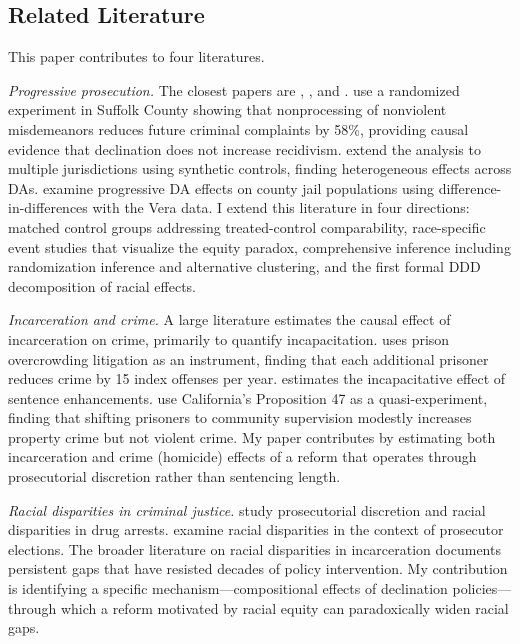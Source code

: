 \documentclass[12pt]{article}
\begin{document}
\subsection{Related Literature}

This paper contributes to four literatures.

\textit{Progressive prosecution.} The closest papers are \citet{agan2023misdemeanor}, \citet{agan2025progressive}, and \citet{petersen2024progressive}. \citet{agan2023misdemeanor} use a randomized experiment in Suffolk County showing that nonprocessing of nonviolent misdemeanors reduces future criminal complaints by 58\%, providing causal evidence that declination does not increase recidivism. \citet{agan2025progressive} extend the analysis to multiple jurisdictions using synthetic controls, finding heterogeneous effects across DAs. \citet{petersen2024progressive} examine progressive DA effects on county jail populations using difference-in-differences with the Vera data. I extend this literature in four directions: matched control groups addressing treated-control comparability, race-specific event studies that visualize the equity paradox, comprehensive inference including randomization inference and alternative clustering, and the first formal DDD decomposition of racial effects.

\textit{Incarceration and crime.} A large literature estimates the causal effect of incarceration on crime, primarily to quantify incapacitation. \citet{levitt1996effect} uses prison overcrowding litigation as an instrument, finding that each additional prisoner reduces crime by 15 index offenses per year. \citet{owens2009more} estimates the incapacitative effect of sentence enhancements. \citet{lofstrom2022incapacitation} use California's Proposition 47 as a quasi-experiment, finding that shifting prisoners to community supervision modestly increases property crime but not violent crime. My paper contributes by estimating both incarceration and crime (homicide) effects of a reform that operates through prosecutorial discretion rather than sentencing length.

\textit{Racial disparities in criminal justice.} \citet{ouss2022prosecutor} study prosecutorial discretion and racial disparities in drug arrests. \citet{sloan2023progressive} examine racial disparities in the context of prosecutor elections. The broader literature on racial disparities in incarceration \citep{western2006punishment, neal2014prison} documents persistent gaps that have resisted decades of policy intervention. My contribution is identifying a specific mechanism---compositional effects of declination policies---through which a reform motivated by racial equity can paradoxically widen racial gaps.
\end{document}
